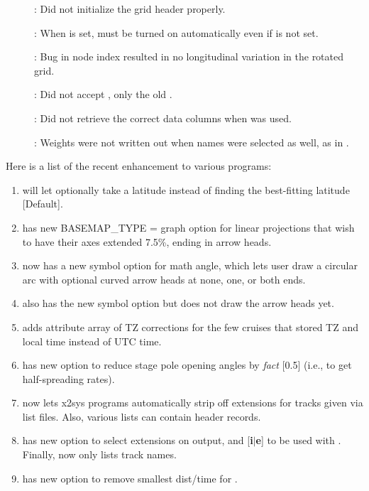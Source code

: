 \begin{description}
	\item []:	Did not initialize the grid header properly.
	\item []:	When  is set,  must be turned on automatically
		even if  is not set.
	\item []:	Bug in node index resulted in no longitudinal variation in the rotated grid.
	\item []:	Did not accept , only the old .
	\item []:	Did not retrieve the correct data columns when  was used.
	\item []:	Weights were not written out when names were selected as well, as in .
\end{description}

Here is a list of the recent enhancement to various programs:

\begin{enumerate}
	\item {} will let  optionally take a latitude instead of finding
		the best-fitting latitude [Default].
	\item {} has new BASEMAP\_TYPE = graph option for linear projections that wish to
		have their axes extended 7.5\%, ending in arrow heads.
	\item {} now has a new symbol  option for math angle, which lets
		user draw a circular arc with optional curved arrow
		heads at none, one, or both ends.
	\item {} also has the new symbol  option but does not draw the arrow heads yet.
	\item {} adds attribute array of TZ corrections for the few cruises
		that stored TZ and local time instead of UTC time.
	\item {} has new option  to reduce stage pole opening
		angles by {\it fact} [0.5] (i.e., to get half-spreading rates).
	\item {} now lets x2sys programs automatically strip off extensions for tracks given via list files.
		Also, various lists can contain header records.
	\item {} has new option  to select extensions on output, and [{\bf i$|$e}] to be used with .
	Finally,  now only lists track names.
	\item {} has new option  to remove smallest dist/time for .
\end{enumerate}


